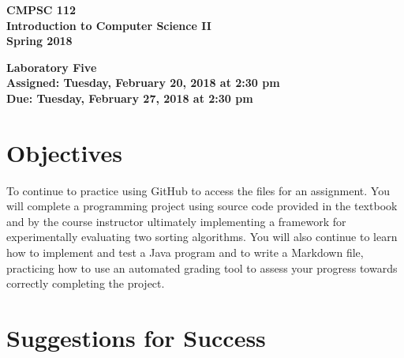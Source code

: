 \documentclass[11pt]{article}
\newcommand{\assignmentduedate}{February 27}
\newcommand{\assignmentassignedate}{February 20}
\newcommand{\assignmentnumber}{Five}
\newcommand{\labyear}{2018}
\newcommand{\labday}{Tuesday}
\newcommand{\labtime}{2:30 pm}
\newcommand{\assigneddate}{Assigned: \labday, \assignmentassignedate, \labyear{} at \labtime{}}
\newcommand{\duedate}{Due: \labday, \assignmentduedate, \labyear{} at \labtime{}}
\newcommand{\labtitle}[1]
{
  \begin{center}
    \begin{center}
      \bf
      CMPSC 112\\Introduction to Computer Science II\\
      Spring 2018\\
      \medskip
    \end{center}
    \bf
    #1
  \end{center}
}
\begin{document}
\thispagestyle{empty}

\labtitle{Laboratory \assignmentnumber{} \\ \assigneddate{} \\ \duedate{}}

\section*{Objectives}

To continue to practice using GitHub to access the files for an assignment. You
will complete a programming project using source code provided in the textbook
and by the course instructor ultimately implementing a framework for
experimentally evaluating two sorting algorithms. You will also continue to
learn how to implement and test a Java program and to write a Markdown file,
practicing how to use an automated grading tool to assess your progress towards
correctly completing the project.

\section*{Suggestions for Success}
\end{document}
